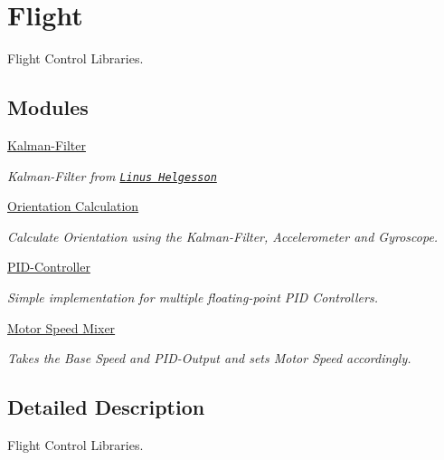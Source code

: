 \hypertarget{group___flight}{\section{Flight}
\label{group___flight}
}


Flight Control Libraries.  


\subsection*{Modules}
\begin{DoxyCompactItemize}
\item 
\hyperlink{group__kalman}{Kalman-\/\-Filter}
\begin{DoxyCompactList}\small\item\em Kalman-\/\-Filter from \href{http://www.linushelgesson.se/2012/04/pitch-and-roll-estimating-kalman-filter-for-stabilizing-quadrocopters/}{\tt Linus Helgesson} \end{DoxyCompactList}\item 
\hyperlink{group__orientation}{Orientation Calculation}
\begin{DoxyCompactList}\small\item\em Calculate Orientation using the Kalman-\/\-Filter, Accelerometer and Gyroscope. \end{DoxyCompactList}\item 
\hyperlink{group__pid}{P\-I\-D-\/\-Controller}
\begin{DoxyCompactList}\small\item\em Simple implementation for multiple floating-\/point P\-I\-D Controllers. \end{DoxyCompactList}\item 
\hyperlink{group__set}{Motor Speed Mixer}
\begin{DoxyCompactList}\small\item\em Takes the Base Speed and P\-I\-D-\/\-Output and sets Motor Speed accordingly. \end{DoxyCompactList}\end{DoxyCompactItemize}


\subsection{Detailed Description}
Flight Control Libraries. 